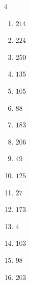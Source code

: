\begin{multicols}{4}
\begin{enumerate}
  \item $214$


  \item $224$


  \item $250$


  \item $135$


  \item $105$


  \item $88$


  \item $183$


  \item $206$


  \item $49$


  \item $125$


  \item $27$


  \item $173$


  \item $4$


\columnbreak %

  \item $103$


  \item $98$


  \item $203$


\end{enumerate}
\end{multicols}
